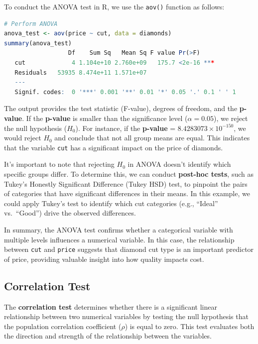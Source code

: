 \documentclass[
]{book}
\newcommand{\passthrough}[1]{#1}
\theoremstyle{definition}
\theoremstyle{definition}
\theoremstyle{definition}
\theoremstyle{definition}
\theoremstyle{remark}
\begin{document}
To conduct the ANOVA test in R, we use the \passthrough{\lstinline!aov()!} function as follows:

\begin{lstlisting}[language=R]
# Perform ANOVA
anova_test <- aov(price ~ cut, data = diamonds)
summary(anova_test)
                  Df    Sum Sq   Mean Sq F value Pr(>F)    
   cut             4 1.104e+10 2.760e+09   175.7 <2e-16 ***
   Residuals   53935 8.474e+11 1.571e+07                   
   ---
   Signif. codes:  0 '***' 0.001 '**' 0.01 '*' 0.05 '.' 0.1 ' ' 1
\end{lstlisting}

The output provides the test statistic (F-value), degrees of freedom, and the \textbf{p-value}. If the \textbf{p-value} is smaller than the significance level (\(\alpha = 0.05\)), we reject the null hypothesis (\(H_0\)). For instance, if the \textbf{p-value} = \ensuremath{8.4283073\times 10^{-150}}, we would reject \(H_0\) and conclude that not all group means are equal. This indicates that the variable \passthrough{\lstinline!cut!} has a significant impact on the price of diamonds.

It's important to note that rejecting \(H_0\) in ANOVA doesn't identify which specific groups differ. To determine this, we can conduct \textbf{post-hoc tests}, such as Tukey's Honestly Significant Difference (Tukey HSD) test, to pinpoint the pairs of categories that have significant differences in their means. In this example, we could apply Tukey's test to identify which cut categories (e.g., ``Ideal'' vs.~``Good'') drive the observed differences.

In summary, the ANOVA test confirms whether a categorical variable with multiple levels influences a numerical variable. In this case, the relationship between \passthrough{\lstinline!cut!} and \passthrough{\lstinline!price!} suggests that diamond cut type is an important predictor of price, providing valuable insight into how quality impacts cost.

\subsection{Correlation Test}\label{correlation-test}

The \textbf{correlation test} determines whether there is a significant linear relationship between two numerical variables by testing the null hypothesis that the population correlation coefficient (\(\rho\)) is equal to zero. This test evaluates both the direction and strength of the relationship between the variables.
\end{document}
